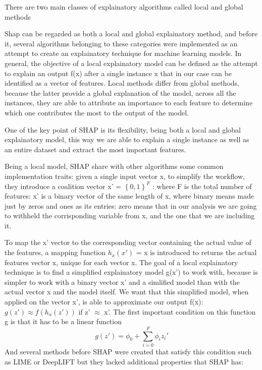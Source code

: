 \documentclass[11pt]{report}
\begin{document}
There are two main classes of explainatory algorithms called local and global methods

Shap can be regarded as both a local and global explainatory method, and before it, several algorithms belonging to these categories were implemented as an attempt to create an explainatory technique for machine learning models.
In general, the objective of a local explainatory model can be defined as the attempt to explain an output f(x) after a single instance x that in our case can be identified as a vector of features.
Local methods differ from global methods, because the latter provide a global explanation of the model, across all the instances, they are able to attribute an importance to each feature to determine which one contributes the most to the output of the model.

One of the key point of SHAP is its flexibility, being both a local and global explainatory model, this way we are able to explain a single instance as well as an entire dataset and extract the most important features.

Being a local model, SHAP share with other algorithms some common implementation traits: given a single input vector x, to simplify the workflow, they introduce a coalition vector x' = $\left\{ 0, 1 \right\}^F$ : where F is the total number of features: x' is a binary vector of the same length of x, where binary means made just by zeros and ones as its entries: zero means that in our analysis we are going to withheld the corrisponding variable from x, and the one that we are including it.

To map the x' vector to the corresponding vector containing the actual value of the features, a mapping function $h_x(x')$ = x is introduced to returns the actual features vector x, unique for each vector x.
The goal of a local explainatory technique is to find a simplified explainatory model g(x') to work with, because is simpler to work with a binary vector x' and a simlified model than with the actual vector x and the model itself.
We want that this simplified model, when applied on the vector x', is able to approximate our output f(x): $ g(z') \approx f(h_x(z'))$ if z' $\approx$ x'.
The first important condition on this function g is that it has to be a linear function
\begin{equation}
\label{eq:shap_g}
g(z') = \phi_0 + \sum_{i = 0}^F \phi_i z_i'
\end{equation}
And several methods before SHAP were created that satisfy this condition such as LIME \cite{ribeiro-2016} or DeepLIFT \cite{shrikumar-2017} but they lacked additional properties that SHAP has:
\end{document}
